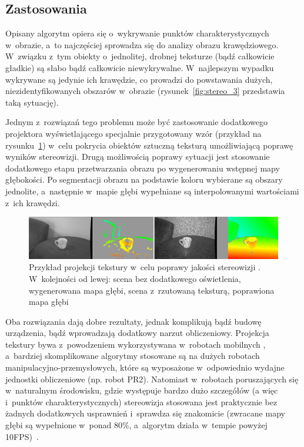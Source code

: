 \subsection{Zastosowania}

Opisany algorytm opiera się o~wykrywanie punktów charakterystycznych w~obrazie, a~to
najczęściej sprowadza się do analizy obrazu krawędziowego. W~związku z~tym
obiekty o~jednolitej, drobnej teksturze (bądź całkowicie gładkie) są słabo bądź
całkowicie niewykrywalne. W~najlepszym wypadku wykrywane są jedynie ich
krawędzie, co prowadzi do powstawania dużych, niezidentyfikowanych obszarów
w~obrazie (rysunek~\ref{fig:stereo_3} przedstawia taką sytuację).

Jednym z~rozwiązań tego problemu może być zastosowanie dodatkowego projektora
wyświetlającego specjalnie przygotowany wzór (przykład na
rysunku~\ref{fig:stereo_texture}) w~celu pokrycia obiektów sztuczną teksturą
umożliwiającą poprawę wyników stereowizji. Drugą możliwością poprawy sytuacji
jest stosowanie dodatkowego etapu przetwarzania obrazu po wygenerowaniu
wstępnej mapy głębokości. Po segmentacji obrazu na podstawie koloru wybierane
są obszary jednolite, a~następnie w~mapie głębi wypełniane są interpolowanymi
wartościami z~ich krawędzi.

\begin{figure}[htpb!]
\centering
\includegraphics[width=16cm]{../../Common/img/stereo_texture}
\caption[Przykład projekcji tekstury w~celu poprawy jakości
stereowizji]{Przykład projekcji tekstury w~celu poprawy jakości stereowizji
\cite{konolige-icra-2010-a}. W~kolejności od lewej: scena bez dodatkowego
oświetlenia, wygenerowana mapa głębi, scena z~rzutowaną teksturą, poprawiona
mapa głębi}
\label{fig:stereo_texture}
\end{figure}

Oba rozwiązania dają dobre rezultaty, jednak komplikują bądź budowę urządzenia,
bądź wprowadzają dodatkowy narzut obliczeniowy. Projekcja tekstury bywa
z~powodzeniem wykorzystywana w~robotach mobilnych \cite{piorkowski2008},
a~bardziej skomplikowane algorytmy stosowane są na dużych robotach
manipulacyjno-przemysłowych, które są wyposażone w~odpowiednio wydajne
jednostki obliczeniowe (np. robot PR2). Natomiast w~robotach poruszających się
w~naturalnym środowisku, gdzie występuje bardzo dużo szczegółów (a więc
i~punktów charakterystycznych) stereowizja stosowana jest praktycznie bez żadnych
dodatkowych usprawnień i~sprawdza się znakomicie (zwracane mapy głębi są
wypełnione w~ponad 80\%, a~algorytm działa w~tempie powyżej 10FPS)~\cite{outdoor-stereo}.


